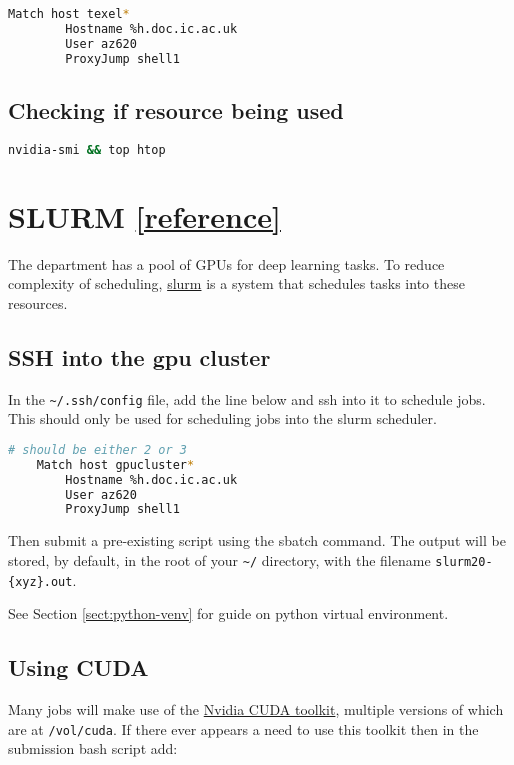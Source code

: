 \documentclass[11pt]{article}
\begin{document}
\begin{lstlisting}[language=bash]
    Match host texel*
        Hostname %h.doc.ic.ac.uk
        User az620
        ProxyJump shell1
\end{lstlisting}

\subsection{Checking if resource being used}

\begin{lstlisting}[language=bash]
    nvidia-smi && top htop
\end{lstlisting}

\section{SLURM \href{https://www.imperial.ac.uk/computing/people/csg/guides/hpcomputing/gpucluster/}{[reference]}}

The department has a pool of GPUs for deep learning tasks. To reduce complexity of scheduling, \href{https://slurm.schedmd.com/}{slurm} is a system that schedules tasks into these resources.

\subsection{SSH into the gpu cluster}

In the \verb|~/.ssh/config| file, add the line below and ssh into it to schedule jobs. This should only be used for scheduling jobs into the slurm scheduler.

\begin{lstlisting}[language=bash]
    # should be either 2 or 3
    Match host gpucluster*
        Hostname %h.doc.ic.ac.uk
        User az620
        ProxyJump shell1
\end{lstlisting}

Then submit a pre-existing script using the sbatch command. The output will be stored, by default, in the root of your \verb|~/| directory, with the filename \verb|slurm20-{xyz}.out|. 

See Section \ref{sect:python-venv} for guide on python virtual environment.

\subsection{Using CUDA}

Many jobs will make use of the \href{https://developer.nvidia.com/cuda-toolkit}{Nvidia CUDA toolkit}, multiple versions of which are at \texttt{/vol/cuda}. If there ever appears a need to use this toolkit then in the submission bash script add:
\end{document}
